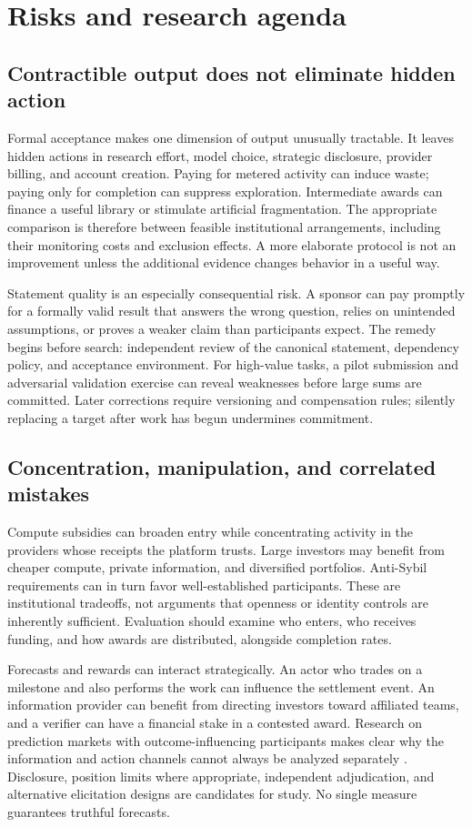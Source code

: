 \documentclass[11pt,a4paper]{article}
\begin{document}
\section{Risks and research agenda}
\label{sec:research}
\subsection{Contractible output does not eliminate hidden action}
Formal acceptance makes one dimension of output unusually tractable. It leaves hidden actions in research effort, model choice, strategic disclosure, provider billing, and account creation. Paying for metered activity can induce waste; paying only for completion can suppress exploration. Intermediate awards can finance a useful library or stimulate artificial fragmentation. The appropriate comparison is therefore between feasible institutional arrangements, including their monitoring costs and exclusion effects. A more elaborate protocol is not an improvement unless the additional evidence changes behavior in a useful way.

Statement quality is an especially consequential risk. A sponsor can pay promptly for a formally valid result that answers the wrong question, relies on unintended assumptions, or proves a weaker claim than participants expect. The remedy begins before search: independent review of the canonical statement, dependency policy, and acceptance environment. For high-value tasks, a pilot submission and adversarial validation exercise can reveal weaknesses before large sums are committed. Later corrections require versioning and compensation rules; silently replacing a target after work has begun undermines commitment.

\subsection{Concentration, manipulation, and correlated mistakes}
Compute subsidies can broaden entry while concentrating activity in the providers whose receipts the platform trusts. Large investors may benefit from cheaper compute, private information, and diversified portfolios. Anti-Sybil requirements can in turn favor well-established participants. These are institutional tradeoffs, not arguments that openness or identity controls are inherently sufficient. Evaluation should examine who enters, who receives funding, and how awards are distributed, alongside completion rates.

Forecasts and rewards can interact strategically. An actor who trades on a milestone and also performs the work can influence the settlement event. An information provider can benefit from directing investors toward affiliated teams, and a verifier can have a financial stake in a contested award. Research on prediction markets with outcome-influencing participants makes clear why the information and action channels cannot always be analyzed separately \citep{manipulation}. Disclosure, position limits where appropriate, independent adjudication, and alternative elicitation designs are candidates for study. No single measure guarantees truthful forecasts.
\end{document}
